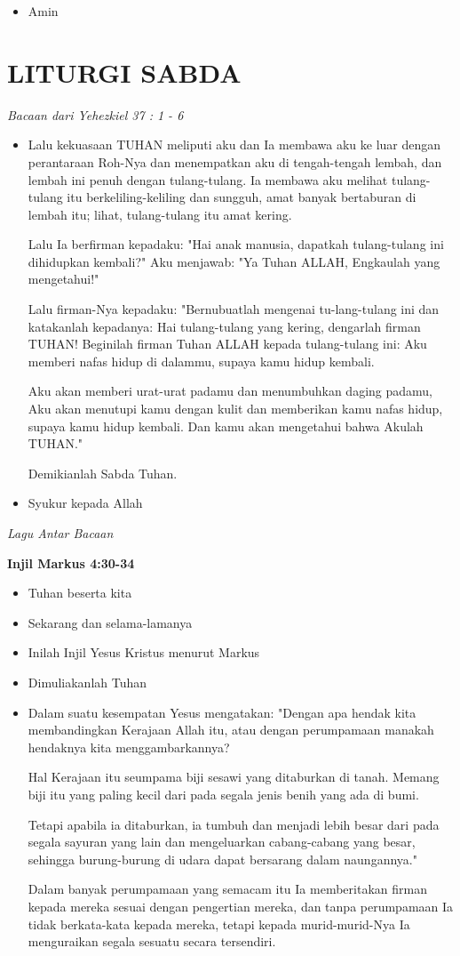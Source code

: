 \documentclass[a5paper,headsepline,titlepage,11pt,nnormalheadings,DIVcalc]{scrbook}
\makeatletter
\newcommand{\subjudul}[1]{%
  {\parindent \z@ 
    \interlinepenalty\@M \bfseries #1\par\nobreak \vskip 10\p@ }}
\newcommand{\lagu}[1]{%
  {\parindent \z@ 
    \interlinepenalty\@M \slshape \mdseries \Large \textit{#1}\par\nobreak \vskip 10\p@ }}
\newcommand{\keterangan}[1]{%
  {\parindent \z@  \slshape 
    \interlinepenalty\@M \textsl{#1}\par\nobreak  \vskip 5\p@}}
\newcommand{\BU}[1]{\begin{itemize} \item[U:] #1 \end{itemize}}
\newcommand{\BI}[1]{\begin{itemize} \item[I:] #1 \end{itemize}}
\newcommand{\BP}[1]{\begin{itemize} \item[P:] #1 \end{itemize}}
\makeatother
\begin{document}
\BU{Amin}

 

\section*{LITURGI SABDA} 

\keterangan{Bacaan dari Yehezkiel 37 : 1 - 6}

\BP{Lalu kekuasaan TUHAN meliputi aku dan Ia membawa aku ke luar dengan perantaraan Roh-Nya dan menempatkan aku di tengah-tengah lembah, dan lembah ini penuh dengan tulang-tulang.
Ia membawa aku melihat tulang-tulang itu berkeliling-keliling dan sungguh, amat banyak bertaburan di lembah itu; lihat, tulang-tulang itu amat kering.

Lalu Ia berfirman kepadaku: "Hai anak manusia, dapatkah tulang-tulang ini dihidupkan kembali?" Aku menjawab: "Ya Tuhan ALLAH, Engkaulah yang mengetahui!"

Lalu firman-Nya kepadaku: "Bernubuatlah mengenai tu-lang-tulang ini dan katakanlah kepadanya: Hai tulang-tulang yang kering, dengarlah firman TUHAN!
Beginilah firman Tuhan ALLAH kepada tulang-tulang ini: Aku memberi nafas hidup di dalammu, supaya kamu hidup kembali.

Aku akan memberi urat-urat padamu dan menumbuhkan daging padamu, Aku akan menutupi kamu dengan kulit dan memberikan kamu nafas hidup, supaya kamu hidup kembali. Dan kamu akan mengetahui bahwa Akulah TUHAN."

Demikianlah Sabda Tuhan.}

\BU{Syukur kepada Allah}

 

\lagu{Lagu Antar Bacaan}


\subjudul{Injil Markus 4:30-34}

\BI{Tuhan beserta kita}

\BU{Sekarang dan selama-lamanya} 

\BI{Inilah Injil Yesus Kristus menurut Markus}

\BU{Dimuliakanlah Tuhan}

\BI{Dalam suatu kesempatan Yesus mengatakan: "Dengan apa hendak kita membandingkan Kerajaan Allah itu, atau dengan perumpamaan manakah hendaknya kita menggambarkannya?

Hal Kerajaan itu seumpama biji sesawi yang ditaburkan di tanah. Memang biji itu yang paling kecil dari pada segala jenis benih yang ada di bumi.

Tetapi apabila ia ditaburkan, ia tumbuh dan menjadi lebih besar dari pada segala sayuran yang lain dan mengeluarkan cabang-cabang yang besar, sehingga burung-burung di udara dapat bersarang dalam naungannya."

Dalam banyak perumpamaan yang semacam itu Ia memberitakan firman kepada mereka sesuai dengan pengertian mereka,
dan tanpa perumpamaan Ia tidak berkata-kata kepada mereka, tetapi kepada murid-murid-Nya Ia menguraikan segala sesuatu secara tersendiri.}
\end{document}
